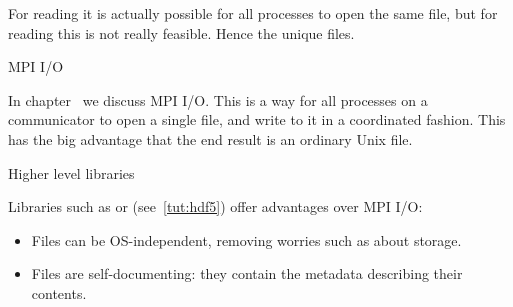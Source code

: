 For reading it is actually possible for all processes to open the same file,
but for reading this is not really feasible. Hence the unique files.

 {MPI I/O}

In chapter~ we discuss MPI I/O.
This is a way for all processes on a communicator to open a single file,
and write to it in a coordinated fashion.
This has the big advantage that the end result is an ordinary Unix file.

 {Higher level libraries}

Libraries such as  or 
(see~\ref{tut:hdf5})
offer advantages over MPI I/O:
\begin{itemize}
\item Files can be OS-independent, removing worries such
  as about  storage.
\item Files are self-documenting: they contain the metadata describing their contents.
\end{itemize}


